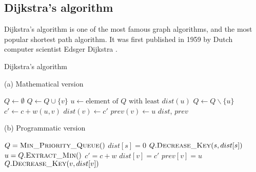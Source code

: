 \subsection{Dijkstra's algorithm} \label{algorithm-shortestpath-dijkstra}
Dijkstra's algorithm is one of the most famous graph algorithms, and the most popular shortest path algorithm. It was first published in 1959 by Dutch computer scientist Edsger Dijkstra \cite{dijkstra}.

\begin{algorithm}[H]
    \caption{Dijkstra's algorithm}
    \label{alg-dijkstra}
    \begin{minipage}[t]{0.49\linewidth}
        (a) Mathematical version
        \begin{algorithmic}[1]
                \State $Q \gets \emptyset$
                    \State $Q \gets Q \cup \{v\}$
                \EndFor
                    \State $u \gets \text{element of } Q \text{ with least } dist(u)$
                    \State $Q \gets Q \backslash \{u\}$
                        \State $c' \gets c + w(u, v)$
                            \State $dist(v) \gets c'$
                            \State $prev(v) \gets u$
                        \EndIf
                    \EndFor
                \EndWhile
                \State \Return $dist$, $prev$
            \EndFunction
        \end{algorithmic}
    \end{minipage}
    \begin{minipage}[t]{0.49\linewidth}
        (b) Programmatic version
        \begin{algorithmic}[1]
                \State $Q = \Call{Min\_Priority\_Queue}{ }$
                \EndFor
                \State $dist[s] = 0$
                \State $Q.\Call{Decrease\_Key}{s, dist[s]}$
                    \State $u = Q.\Call{Extract\_Min}{ }$
                        \State $c' = c + w$
                            \State $dist[v] = c'$
                            \State $prev[v] = u$
                            \State $Q.\Call{Decrease\_Key}{v, dist[v]}$
                        \EndIf
                    \EndFor
                \EndWhile
                \State {}
            \EndFunction
        \end{algorithmic}
    \end{minipage}
\end{algorithm}
